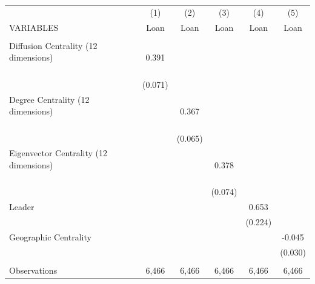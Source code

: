 \begin{tabular}{lccccc} \hline
 & (1) & (2) & (3) & (4) & (5) \\
VARIABLES & Loan & Loan & Loan & Loan & Loan \\ \hline
 &  &  &  &  &  \\
Diffusion Centrality (12 dimensions) \ \ \ \ \ \ \ \ \ \ \ \ \ \ \ \ \ \ \ \ \ \ & 0.391 &  &  &  &  \\
 & (0.071) &  &  &  &  \\
Degree Centrality (12 dimensions) \ \ \ \ \ \ \ \ \ \ \ \ \ \ \ \ \ \ \ \ \ \ \ &  & 0.367 &  &  &  \\
 &  & (0.065) &  &  &  \\
Eigenvector Centrality (12 dimensions) \ \ \ \ \ \ \ \ \ \ \ \ \ \ \ \ \ \ \ \ \ &  &  & 0.378 &  &  \\
 &  &  & (0.074) &  &  \\
Leader &  &  &  & 0.653 &  \\
 &  &  &  & (0.224) &  \\
Geographic Centrality &  &  &  &  & -0.045 \\
 &  &  &  &  & (0.030) \\
 &  &  &  &  &  \\
 Observations & 6,466 & 6,466 & 6,466 & 6,466 & 6,466 \\ \hline
\end{tabular}

